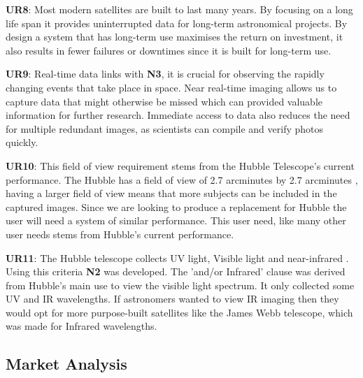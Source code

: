\textbf{UR8}: Most modern satellites are built to last many years. By focusing on a long life span it provides uninterrupted data for long-term astronomical projects. By design a system that has long-term use maximises the return on investment, it also results in fewer failures or downtimes since it is built for long-term use.\\
\vspace{1.5mm}

\textbf{UR9}: Real-time data links with \textbf{N3}, it is crucial for observing the rapidly changing events that take place in space. Near real-time imaging allows us to capture data that might otherwise be missed which can provided valuable information for further research. Immediate access to data also reduces the need for multiple redundant images, as scientists can compile and verify photos quickly. 

\textbf{UR10}: This field of view requirement stems from the Hubble Telescope's current performance. The Hubble has a field of view of 2.7 arcminutes by 2.7 arcminutes \cite{STScI2023}, having a larger field of view means that more subjects can be included in the captured images. Since we are looking to produce a replacement for Hubble the user will need a system of similar performance. This user need, like many other user needs stems from Hubble's current performance.\\
\vspace{1.5mm} 

\textbf{UR11}: The Hubble telescope collects UV light, Visible light and near-infrared \cite{NASA2023_W}. Using this criteria \textbf{N2} was developed. The 'and/or Infrared' clause was derived from Hubble's main use to view the visible light spectrum. It only collected some UV and IR wavelengths. If astronomers wanted to view IR imaging then they would opt for more purpose-built satellites like the James Webb telescope, which was made for Infrared wavelengths.\\
\vspace{1.5mm}

\subsection{Market Analysis}
